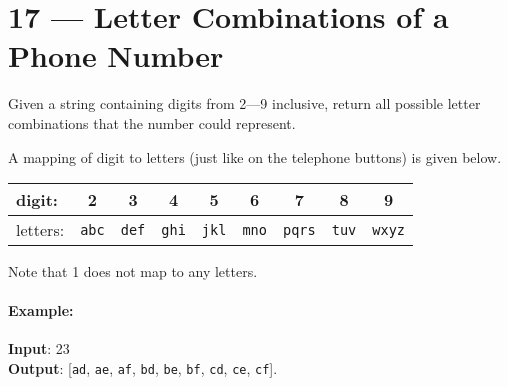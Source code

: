 \section{17 --- Letter Combinations of a Phone Number}
Given a string containing digits from 2---9 inclusive, return all possible letter combinations that the number could represent.
\par
A mapping of digit to letters (just like on the telephone buttons) is given below.
\begin{table}[H]
\begin{tabular}{l*{8}{c}}
digit: & 2 & 3 & 4 & 5 & 6 & 7 & 8 & 9 \\   
\hline
letters: & \texttt{abc} & \texttt{def}  & \texttt{ghi} & \texttt{jkl} & \texttt{mno} & \texttt{pqrs}  & \texttt{tuv}  & \texttt{wxyz}
\end{tabular}
\end{table}
Note that 1 does not map to any letters.

\paragraph{Example:}

\begin{flushleft}
\textbf{Input}: 23
\\
\textbf{Output}: [\texttt{ad}, \texttt{ae}, \texttt{af}, \texttt{bd}, \texttt{be}, \texttt{bf}, \texttt{cd}, \texttt{ce}, \texttt{cf}].
\end{flushleft}

